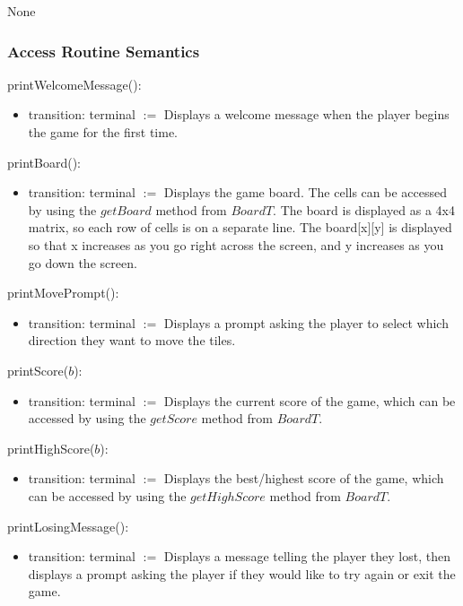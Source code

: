 \documentclass[12pt]{article}
\begin{document}
None

\subsubsection* {Access Routine Semantics}

\noindent printWelcomeMessage():
\begin{itemize}
  \item transition: terminal $:=$ Displays a welcome message when the player begins the game for the first time.
\end{itemize}

\noindent printBoard():
\begin{itemize}
\item transition: terminal $:=$ Displays the game board. The cells can be accessed by using the $getBoard$ method from $BoardT$. The board is displayed as a 4x4 matrix, so each row of cells is on a separate line. The board[x][y] is displayed so that x increases as you go right across the screen, and y increases as you go down the screen.
\end{itemize}

\noindent printMovePrompt():
\begin{itemize}
\item transition: terminal $:=$ Displays a prompt asking the player to select which direction they want to move the tiles.
\end{itemize}

\noindent printScore($b$):
\begin{itemize}
\item transition: terminal $:=$ Displays the current score of the game, which can be accessed by using the $getScore$ method from $BoardT$.
\end{itemize}

\noindent printHighScore($b$):
\begin{itemize}
\item transition: terminal $:=$ Displays the best/highest score of the game, which can be accessed by using the $getHighScore$ method from $BoardT$.
\end{itemize}

\noindent printLosingMessage():
\begin{itemize}
\item transition: terminal $:=$ Displays a message telling the player they lost, then displays a prompt asking the player if they would like to try again or exit the game.
\end{itemize}
\end{document}
